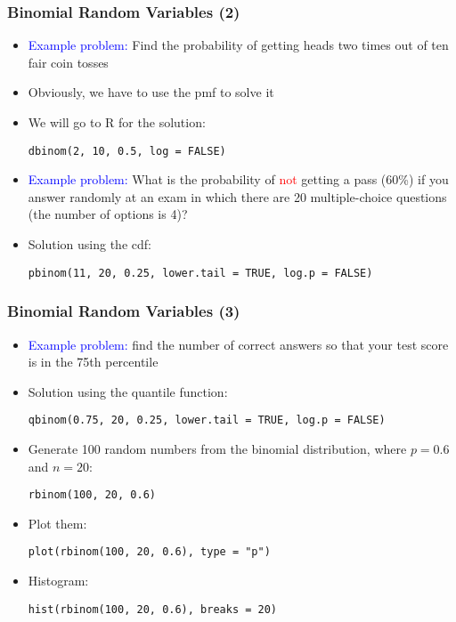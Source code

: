 \documentclass[10pt]{beamer}
\theoremstyle{definition}
\begin{document}
\begin{frame}[fragile]
\frametitle{Binomial Random Variables (2)}
\begin{itemize}
	\item \textcolor{blue}{Example problem:} Find the probability of getting heads two times out of ten fair coin tosses
		
	\item Obviously, we have to use the pmf to solve it
		
	\item We will go to R for the solution:
	\begin{lstlisting}[style = rstyle, breaklines]
	dbinom(2, 10, 0.5, log = FALSE)
	\end{lstlisting}
	
	\item \textcolor{blue}{Example problem:} What is the probability of \textcolor{red}{not} getting a pass (60\%) if you answer randomly at an exam in which there are 20 multiple-choice questions (the number of options is 4)?
		
	\item Solution using the cdf:
	\begin{lstlisting}[style = rstyle, breaklines]
	pbinom(11, 20, 0.25, lower.tail = TRUE, log.p = FALSE)
	\end{lstlisting} 
\end{itemize}
\end{frame}

\begin{frame}[fragile]
\frametitle{Binomial Random Variables (3)}
\begin{itemize}
	\item \textcolor{blue}{Example problem:} find the number of correct answers so that your test score is in the 75th percentile
		
	\item Solution using the quantile function:
	\begin{lstlisting}[style = rstyle, breaklines]
	qbinom(0.75, 20, 0.25, lower.tail = TRUE, log.p = FALSE)
	\end{lstlisting} 
	
	\item Generate 100 random numbers from the binomial distribution, where $p = 0.6$ and $n = 20$:
	\begin{lstlisting}[style = rstyle, breaklines]
	rbinom(100, 20, 0.6)
	\end{lstlisting}
	
	\item Plot them:
	\begin{lstlisting}[style = rstyle, breaklines]
	plot(rbinom(100, 20, 0.6), type = "p")
	\end{lstlisting}
	
	\item Histogram:
	\begin{lstlisting}[style = rstyle, breaklines]
	hist(rbinom(100, 20, 0.6), breaks = 20)
	\end{lstlisting} 
\end{itemize}
\end{frame}
\end{document}
